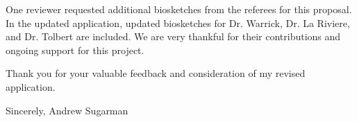 \documentclass{nihgrant}
\begin{document}
One reviewer requested additional biosketches from the referees for this proposal. In the updated application, updated biosketches for Dr. Warrick, Dr. La Riviere, and Dr. Tolbert are included. We are very thankful for their contributions and ongoing support for this project.

\vspace{2.5mm}

\noindent Thank you for your valuable feedback and consideration of my revised application.

\noindent Sincerely,
\noindent Andrew Sugarman
\end{document}

